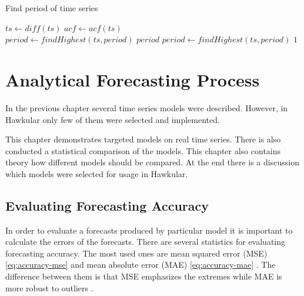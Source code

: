     \begin{algorithm}
        \caption{Find period of time series} \label{alg:period-find}
        \begin{algorithmic}[1]
             
                \State $ts \gets diff(ts)$ 
            \EndIf
            \State $acf \gets acf(ts)$ \\
            \State $period \gets findHighest(ts, period)$
                    \State \Return $period$
                \EndIf
              \State $period \gets findHighest(ts, period)$
            \EndWhile
            \State \Return $1$
        \EndFunction
        \end{algorithmic}
    \end{algorithm}

\chapter{Analytical Forecasting Process} \label{chap:models-demonstration}
In the previous chapter several time series models were described. However, in Hawkular only few of them were
selected and implemented.

This chapter demonstrates targeted models on real time series. There is also conducted a
statistical comparison of the models. This chapter also contains theory how different models should be compared. At
the end there is a discussion which models were selected for usage in Hawkular.

    \section{Evaluating Forecasting Accuracy} \label{sec:mse-mae}
    In order to evaluate a forecasts produced by particular model it is important to calculate the errors of the
    forecasts. There are several statistics for evaluating forecasting accuracy. The most used ones are mean squared
    error (MSE) \ref{eq:accuracy-mse} and mean absolute error (MAE) \ref{eq:accuracy-mae} \cite{statistika}. The
    difference between them is that MSE emphasizes the extremes while MAE is more robust to outliers
    \cite{hyndman-forecasting}.

